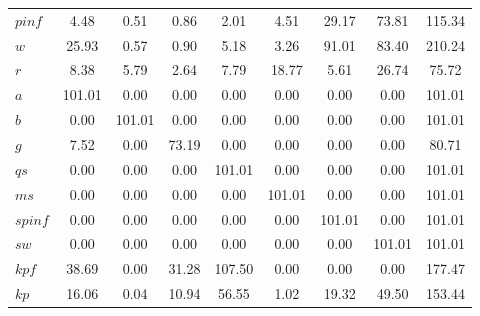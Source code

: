 \begin{center}
\begin{longtable}{lcccccccc}
$pinf     $	 & 	                4.48	 & 	                0.51	 & 	                0.86	 & 	                2.01	 & 	                4.51	 & 	               29.17	 & 	               73.81	 & 	              115.34 \\ 
$w        $	 & 	               25.93	 & 	                0.57	 & 	                0.90	 & 	                5.18	 & 	                3.26	 & 	               91.01	 & 	               83.40	 & 	              210.24 \\ 
$r        $	 & 	                8.38	 & 	                5.79	 & 	                2.64	 & 	                7.79	 & 	               18.77	 & 	                5.61	 & 	               26.74	 & 	               75.72 \\ 
$a        $	 & 	              101.01	 & 	                0.00	 & 	                0.00	 & 	                0.00	 & 	                0.00	 & 	                0.00	 & 	                0.00	 & 	              101.01 \\ 
$b        $	 & 	                0.00	 & 	              101.01	 & 	                0.00	 & 	                0.00	 & 	                0.00	 & 	                0.00	 & 	                0.00	 & 	              101.01 \\ 
$g        $	 & 	                7.52	 & 	                0.00	 & 	               73.19	 & 	                0.00	 & 	                0.00	 & 	                0.00	 & 	                0.00	 & 	               80.71 \\ 
$qs       $	 & 	                0.00	 & 	                0.00	 & 	                0.00	 & 	              101.01	 & 	                0.00	 & 	                0.00	 & 	                0.00	 & 	              101.01 \\ 
$ms       $	 & 	                0.00	 & 	                0.00	 & 	                0.00	 & 	                0.00	 & 	              101.01	 & 	                0.00	 & 	                0.00	 & 	              101.01 \\ 
$spinf    $	 & 	                0.00	 & 	                0.00	 & 	                0.00	 & 	                0.00	 & 	                0.00	 & 	              101.01	 & 	                0.00	 & 	              101.01 \\ 
$sw       $	 & 	                0.00	 & 	                0.00	 & 	                0.00	 & 	                0.00	 & 	                0.00	 & 	                0.00	 & 	              101.01	 & 	              101.01 \\ 
$kpf      $	 & 	               38.69	 & 	                0.00	 & 	               31.28	 & 	              107.50	 & 	                0.00	 & 	                0.00	 & 	                0.00	 & 	              177.47 \\ 
$kp       $	 & 	               16.06	 & 	                0.04	 & 	               10.94	 & 	               56.55	 & 	                1.02	 & 	               19.32	 & 	               49.50	 & 	              153.44 \\ 
\end{longtable}
 \end{center}
